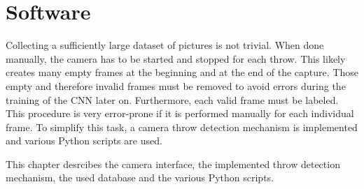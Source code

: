 \section{Software}
\label{sec:software}

Collecting a sufficiently large dataset of pictures is not trivial.
When done manually, the camera has to be started and stopped for each throw.
This likely creates many empty frames at the beginning and at the end of the capture.
Those empty and therefore invalid frames must be removed to avoid errors during the training of the CNN later on.
Furthermore, each valid frame must be labeled.
This procedure is very error-prone if it is performed manually for each individual frame.
To simplify this task, a camera throw detection mechanism is implemented and various Python scripts are used.

This chapter desrcibes the camera interface, the implemented throw detection mechanism, the used database and the various Python scripts.




\clearpage


